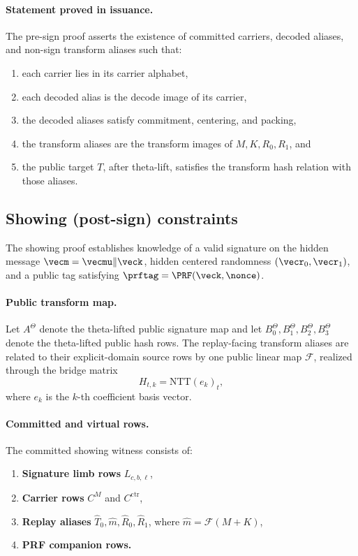 \paragraph{Statement proved in issuance.}
The pre-sign proof asserts the existence of committed carriers, decoded aliases,
and non-sign transform aliases such that:
\begin{enumerate}[leftmargin=1.25em]
  \item each carrier lies in its carrier alphabet,
  \item each decoded alias is the decode image of its carrier,
  \item the decoded aliases satisfy commitment, centering, and packing,
  \item the transform aliases are the transform images of \(M,K,R_0,R_1\), and
  \item the public target \(T\), after theta-lift, satisfies the transform
  hash relation with those aliases.
\end{enumerate}

\subsection{Showing (post-sign) constraints}
\label{subsec:smallwood-showing}
The showing proof establishes knowledge of a valid signature on the hidden
message \(\vecm=\vecmu\Vert\veck\), hidden centered randomness
\((\vecr_0,\vecr_1)\), and a public tag satisfying
\(\prftag=\PRF(\veck,\nonce)\).

\paragraph{Public transform map.}
Let \(A^\Theta\) denote the theta-lifted public signature map and let
\(B_0^\Theta,B_1^\Theta,B_2^\Theta,B_3^\Theta\) denote the theta-lifted public
hash rows. The replay-facing transform aliases are related to their
explicit-domain source rows by one public linear map \(\mathcal F\), realized
through the bridge matrix
\[
  H_{t,k}=\mathrm{NTT}(e_k)_t,
\]
where \(e_k\) is the \(k\)-th coefficient basis vector.

\paragraph{Committed and virtual rows.}
The committed showing witness consists of:
\begin{enumerate}[leftmargin=1.25em]
  \item \textbf{Signature limb rows} \(L_{c,b,\ell}\),
  \item \textbf{Carrier rows} \(C^M\) and \(C^{\mathrm{ctr}}\),
  \item \textbf{Replay aliases}
  \(\widehat T_0,\widehat m,\widehat R_0,\widehat R_1\), where
  \(\widehat m=\mathcal F(M+K)\),
  \item \textbf{PRF companion rows.}
\end{enumerate}

